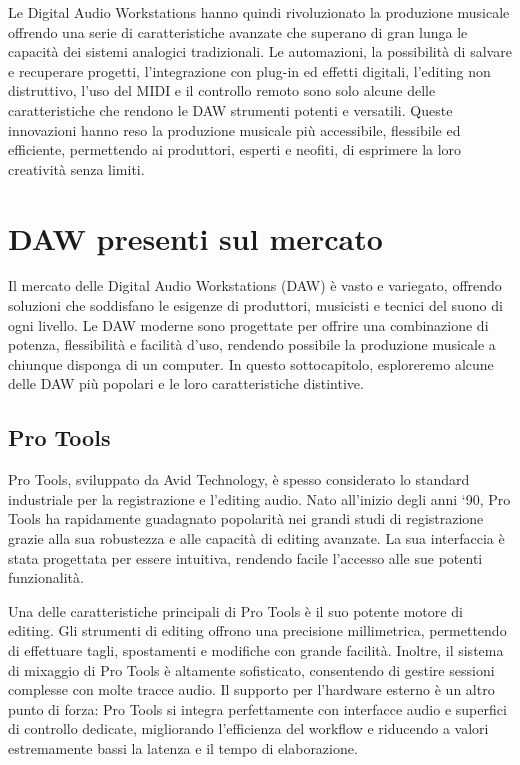\documentclass{book}
\begin{document}
Le Digital Audio Workstations hanno quindi rivoluzionato la produzione musicale offrendo una serie di caratteristiche avanzate che superano di gran lunga le capacità dei sistemi analogici tradizionali. Le automazioni, la possibilità di salvare e recuperare progetti, l’integrazione con plug-in ed effetti digitali, l’editing non distruttivo, l’uso del MIDI e il controllo remoto sono solo alcune delle caratteristiche che rendono le DAW strumenti potenti e versatili. Queste innovazioni hanno reso la produzione musicale più accessibile, flessibile ed efficiente, permettendo ai produttori, esperti e neofiti, di esprimere la loro creatività senza limiti.

\section{DAW presenti sul mercato}

Il mercato delle Digital Audio Workstations (DAW) è vasto e variegato, offrendo soluzioni che soddisfano le esigenze di produttori, musicisti e tecnici del suono di ogni livello. Le DAW moderne sono progettate per offrire una combinazione di potenza, flessibilità e facilità d’uso, rendendo possibile la produzione musicale a chiunque disponga di un computer. In questo sottocapitolo, esploreremo alcune delle DAW più popolari e le loro caratteristiche distintive.

\subsection{Pro Tools}

Pro Tools, sviluppato da Avid Technology, è spesso considerato lo standard industriale per la registrazione e l’editing audio. Nato all’inizio degli anni ‘90, Pro Tools ha rapidamente guadagnato popolarità nei grandi studi di registrazione grazie alla sua robustezza e alle capacità di editing avanzate. La sua interfaccia è stata progettata per essere intuitiva, rendendo facile l’accesso alle sue potenti funzionalità.

Una delle caratteristiche principali di Pro Tools è il suo potente motore di editing. Gli strumenti di editing offrono una precisione millimetrica, permettendo di effettuare tagli, spostamenti e modifiche con grande facilità. Inoltre, il sistema di mixaggio di Pro Tools è altamente sofisticato, consentendo di gestire sessioni complesse con molte tracce audio. Il supporto per l’hardware esterno è un altro punto di forza: Pro Tools si integra perfettamente con interfacce audio e superfici di controllo dedicate, migliorando l’efficienza del workflow e riducendo a valori estremamente bassi la latenza e il tempo di elaborazione.
\end{document}
